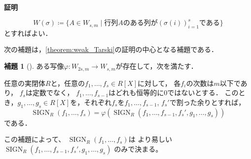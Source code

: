 \documentclass[uplatex, dvipdfmx]{jsarticle}
\makeatletter
\numberwithin{equation}{section}
\renewenvironment{proof}[1][\proofname]{\par
  \pushQED{\qed}%
  \normalfont \topsep6\p@\@plus6\p@\relax
  \trivlist
  \item\relax
  {\bfseries
  #1\@addpunct{.}}\hspace\labelsep\ignorespaces
}{
  \popQED\endtrivlist\@endpefalse
}
\newcommand{\map}[3]{{#1}\colon{#2}\rightarrow{#3}}
\DeclareMathOperator{\SIGN}{SIGN}
\theoremstyle{definition}
\newtheorem{lemma}[definition]{補題}
\renewcommand{\proofname}{\textbf{証明}}
\makeatother
\begin{document}
\begin{proof}
     \begin{equation}
          W(\sigma)\coloneqq\{A \in W_{s,m} \mid \text{行列$A$のある列が$(\sigma(i))_{i=1}^s$である}\}
     \end{equation}
     とすればよい．
\end{proof}

次の補題は，\cref{theorem:weak_Tarski}の証明の中心となる補題である．

\begin{lemma}[{\cite[Lemma 1.4.5]{MR1659509}}]\label{lemma:qe_lowering}
     ある写像$\map{\varphi}{W_{2s,m}}{W_{s,m}}$が存在して，次を満たす．

     任意の実閉体$R$と，任意の$f_1, \dots, f_s \in R[X]$に対して，
     各$f_i$の次数は$m$以下であり，
     $f_s$は定数でなく，
     $f_1, \dots, f_{s-1}$はどれも恒等的に$0$ではないとする．
     このとき，$g_1, \dots, g_s \in R[X]$を，それぞれ$f_s$を$f_1, \dots, f_{s-1}$, $f_s'$で割った余りとすれば，
     \begin{equation}
          \SIGN_R(f_1, \dots, f_s) = \varphi(\SIGN_R(f_1, \dots, f_{s-1}, f_s', g_1, \dots, g_s))
     \end{equation}
     である．
\end{lemma}

この補題によって、
$\SIGN_R(f_1, \dots, f_s)$は
より易しい
$
\SIGN_R(f_1, \dots, f_{s-1}, f_s', g_1, \dots, g_s)
$
のみで決まる。
\end{document}
